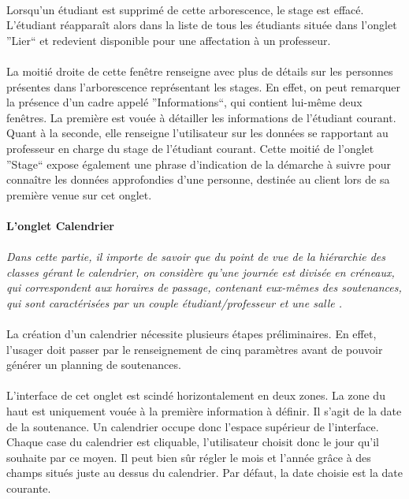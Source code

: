 \documentclass[a4paper,10pt]{report}
\begin{document}
		\paragraph{}
		  Lorsqu'un étudiant est supprimé de cette arborescence, le stage est effacé.
		  L'étudiant réapparaît alors dans la liste de tous les étudiants située dans l'onglet ''Lier`` et redevient disponible pour une affectation à un professeur.
		  
		\paragraph{}
		  La moitié droite de cette fenêtre renseigne avec plus de détails sur les personnes présentes dans l'arborescence représentant les stages.
		  En effet, on peut remarquer la présence d'un cadre appelé ''Informations``, qui contient lui-même deux fenêtres.
		  La première est vouée à détailler les informations de l'étudiant courant. 
		  Quant à la seconde, elle renseigne l'utilisateur sur les données se rapportant au professeur en charge du stage de l'étudiant courant. 
		  Cette moitié de l'onglet ''Stage`` expose également une phrase d'indication de la démarche à suivre pour connaître les données approfondies d'une personne, destinée au client lors de sa première venue sur cet onglet.
		  
	      \paragraph{L'onglet Calendrier}
		\paragraph{}
		  \textit{Dans cette partie, il importe de savoir que du point de vue de la hiérarchie des classes gérant le calendrier, on considère qu'une journée est divisée en créneaux, qui correspondent aux horaires de passage, contenant eux-mêmes des soutenances, qui sont caractérisées par un couple étudiant/professeur et une salle	.} 
		  
		\paragraph{}  
		  La création d'un calendrier nécessite plusieurs étapes préliminaires.
		  En effet, l'usager doit passer par le renseignement de cinq paramètres avant de pouvoir générer un planning de soutenances.
		  
		\paragraph{}
		  L'interface de cet onglet est scindé horizontalement en deux zones.
		  La zone du haut est uniquement vouée à la première information à définir.
		  Il s'agit de la date de la soutenance.
		  Un calendrier occupe donc l'espace supérieur de l'interface.
		  Chaque case du calendrier est cliquable, l'utilisateur choisit donc le jour qu'il souhaite par ce moyen.
		  Il peut bien sûr régler le mois et l'année grâce à des champs situés juste au dessus du calendrier.
		  Par défaut, la date choisie est la date courante.
		  
\end{document}
